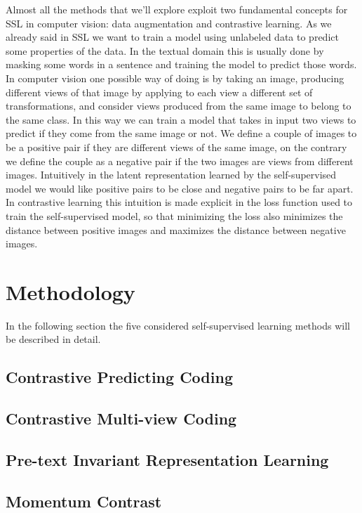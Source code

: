 \documentclass[12pt]{article}
\begin{document}
	Almost all the methods that we'll explore exploit two fundamental concepts for SSL in computer vision: data augmentation and contrastive learning. As we already said in SSL we want to train a model using unlabeled data to predict some properties of the data. In the textual domain this is usually done by masking some words in a sentence and training the model to predict those words. In computer vision one possible way of doing is by taking an image, producing different views of that image by applying to each view a different set of transformations, and consider views produced from the same image to belong to the same class. In this way we can train a model that takes in input two views to predict if they come from the same image or not. We define a couple of images to be a positive pair if they are different views of the same image, on the contrary we define the couple as a negative pair if the two images are views from different images. Intuitively in the latent representation learned by the self-supervised model we would like positive pairs to be close and negative pairs to be far apart. In contrastive learning this intuition is made explicit in the loss function used to train the self-supervised model, so that minimizing the loss also minimizes the distance between positive images and maximizes the distance between negative images.

	
	\section{Methodology}
	In the following section the five considered self-supervised learning methods will be described in detail.

	\subsection*{Contrastive Predicting Coding}
	
	
	\subsection*{Contrastive Multi-view Coding}
	
	
	\subsection*{Pre-text Invariant Representation Learning}
	
	
	\subsection*{Momentum Contrast}
	
	
\end{document}
